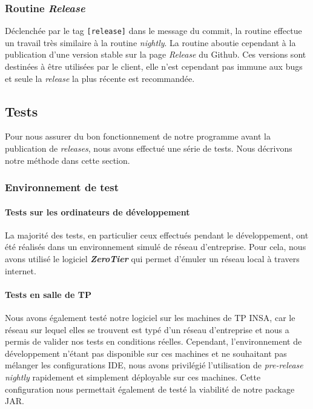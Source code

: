 \documentclass[12pt, a4paper]{article}
\begin{document}
    \subsubsection{Routine \textit{Release}}
    Déclenchée par le tag \texttt{[release]} dans le message du commit, la routine effectue un travail très similaire à la routine \textit{nightly}. La routine aboutie cependant à la publication d'une version stable sur la page \textit{Release} du Github. Ces versions sont destinées à être utilisées par le client, elle n'est cependant pas immune aux bugs et seule la \textit{release} la plus récente est recommandée.
    
    
    \subsection{Tests}
    Pour nous assurer du bon fonctionnement de notre programme avant la publication de \textit{releases}, nous avons effectué une série de tests. Nous décrivons notre méthode dans cette section.
    
    \subsubsection{Environnement de test}
    \paragraph{Tests sur les ordinateurs de développement}
    La majorité des tests, en particulier ceux effectués pendant le développement, ont été réalisés dans un environnement simulé de réseau d'entreprise. Pour cela, nous avons utilisé le logiciel \textbf{\textit{ZeroTier}} qui permet d'émuler un réseau local à travers internet.
    
    \paragraph{Tests en salle de TP}
    Nous avons également testé notre logiciel sur les machines de TP INSA, car le réseau sur lequel elles se trouvent est typé d'un réseau d'entreprise et nous a permis de valider nos tests en conditions réelles. Cependant, l'environnement de développement n'étant pas disponible sur ces machines et ne souhaitant pas mélanger les configurations IDE, nous avons privilégié l'utilisation de \textit{pre-release nightly} rapidement et simplement déployable sur ces machines. Cette configuration nous permettait également de testé la viabilité de notre package JAR.
    
\end{document}

